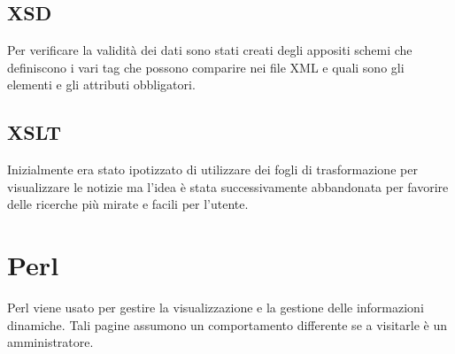 \documentclass{article}
\begin{document}
	\subsection{XSD}
		Per verificare la validità dei dati sono stati creati degli appositi schemi che definiscono i vari tag che possono
		comparire nei file XML e quali sono gli elementi e gli attributi obbligatori.
		
	\subsection{XSLT}
		Inizialmente era stato ipotizzato di utilizzare dei fogli di trasformazione per visualizzare le notizie ma l'idea 
		è stata successivamente abbandonata per favorire delle ricerche più mirate e facili per l'utente.


\section{Perl}
	Perl viene usato per gestire la visualizzazione e la gestione delle informazioni dinamiche. 
	Tali pagine assumono un comportamento differente se a visitarle è un amministratore.
\end{document}
